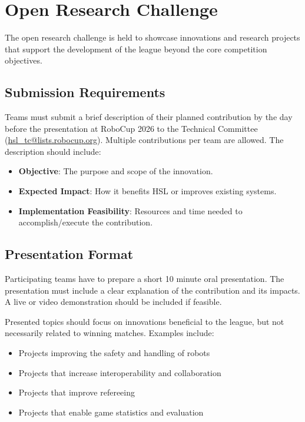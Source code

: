 
\section{Open Research Challenge}
\label{ssec:orc}

The open research challenge is held to showcase innovations and research projects that support the development of the league beyond the core competition objectives. 

\subsection{Submission Requirements}
Teams must submit a brief description of their planned contribution by the day before the presentation at RoboCup 2026 to the Technical Committee (\url{hsl_tc@lists.robocup.org}).
Multiple contributions per team are allowed.
The description should include:
    \begin{itemize}
        \item \textbf{Objective}: The purpose and scope of the innovation.
        \item \textbf{Expected Impact}: How it benefits HSL or improves existing systems.
        \item \textbf{Implementation Feasibility}: Resources and time needed to accomplish/execute the contribution.
    \end{itemize}
    
\subsection{Presentation Format}
Participating teams have to prepare a short 10 minute oral presentation. The presentation must include a clear explanation of the contribution and its impacts. A live or video demonstration should be included if feasible.

Presented topics should focus on innovations beneficial to the league, but not necessarily related to winning matches. Examples include:

\begin{itemize}
\item Projects improving the safety and handling of robots
\item Projects that increase interoperability and collaboration
\item Projects that improve refereeing
\item Projects that enable game statistics and evaluation
\end{itemize}

